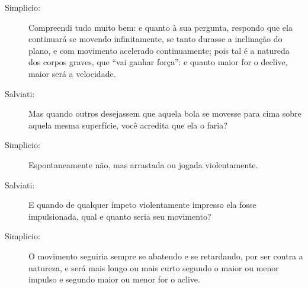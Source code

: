 \begin{description}
\item[Simplicio:] Compreendi tudo muito bem: e quanto à sua pergunta, respondo que ela continuará se movendo infinitamente, se tanto durasse a inclinação do plano, e com movimento acelerado continuamente; pois tal é a natureda dos corpos graves, que ``vai ganhar força'': e quanto maior for o declive, maior será a velocidade.

\item[Salviati:] Mas quando outros desejassem que aquela bola se movesse para cima sobre aquela mesma superfície, você acredita que ela o faria?

\item[Simplicio:] Espontaneamente não, mas arrastada ou jogada violentamente.

\item[Salviati:] E quando de qualquer ímpeto violentamente impresso ela fosse impulsionada, qual e quanto seria seu movimento?

\item[Simplicio:] O movimento seguiria sempre se abatendo e se retardando, por ser contra a natureza, e será mais longo ou mais curto segundo o maior ou menor impulso e segundo maior ou menor for o aclive.


\end{description}
